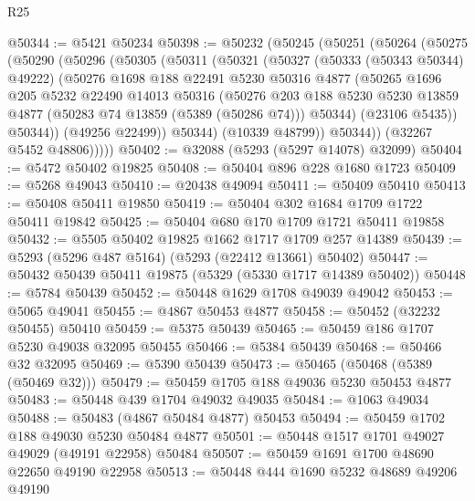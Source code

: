 \begin{lexlean}{R25}
\begin{coremodule}
@50344 := @5421 @50234
@50398 := @50232
    (@50245
      (@50251
        (@50264
          (@50275
            (@50290
              (@50296
                (@50305
                  (@50311
                    (@50321
                      (@50327
                        (@50333 (@50343 @50344) @49222)
                        (@50276
                          @1698
                          @188
                          @22491
                          @5230
                          @50316
                          @4877
                          (@50265
                            @1696
                            @205
                            @5232
                            @22490
                            @14013
                            @50316
                            (@50276
                              @203
                              @188
                              @5230
                              @5230
                              @13859
                              @4877
                              (@50283 @74 @13859 (@5389 (@50286 @74)))
                              @50344)
                            (@23106 @5435))
                          @50344))
                      (@49256 @22499))
                    @50344)
                  (@10339 @48799))
                @50344))
            (@32267 @5452 @48806)))))
@50402 := @32088 (@5293 (@5297 @14078) @32099)
@50404 := @5472 @50402 @19825
@50408 := @50404 @896 @228 @1680 @1723
@50409 := @5268 @49043
@50410 := @20438 @49094
@50411 := @50409 @50410
@50413 := @50408 @50411 @19850
@50419 := @50404 @302 @1684 @1709 @1722 @50411 @19842
@50425 := @50404 @680 @170 @1709 @1721 @50411 @19858
@50432 := @5505 @50402 @19825 @1662 @1717 @1709 @257 @14389
@50439 := @5293 (@5296 @487 @5164) (@5293 (@22412 @13661) @50402)
@50447 := @50432 @50439 @50411 @19875 (@5329 (@5330 @1717 @14389 @50402))
@50448 := @5784 @50439
@50452 := @50448 @1629 @1708 @49039 @49042
@50453 := @5065 @49041
@50455 := @4867 @50453 @4877
@50458 := @50452 (@32232 @50455) @50410
@50459 := @5375 @50439
@50465 := @50459 @186 @1707 @5230 @49038 @32095 @50455
@50466 := @5384 @50439
@50468 := @50466 @32 @32095
@50469 := @5390 @50439
@50473 := @50465 (@50468 (@5389 (@50469 @32)))
@50479 := @50459 @1705 @188 @49036 @5230 @50453 @4877
@50483 := @50448 @439 @1704 @49032 @49035
@50484 := @1063 @49034
@50488 := @50483 (@4867 @50484 @4877) @50453
@50494 := @50459 @1702 @188 @49030 @5230 @50484 @4877
@50501 := @50448 @1517 @1701 @49027 @49029 (@49191 @22958) @50484
@50507 := @50459 @1691 @1700 @48690 @22650 @49190 @22958
@50513 := @50448 @444 @1690 @5232 @48689 @49206 @49190

\end{coremodule}
\end{lexlean}
